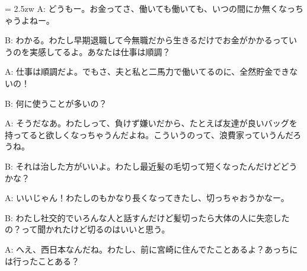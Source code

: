 \documentclass[11pt]{amsart}
\title{}
\author{}
\newenvironment{hangall}[1]{\hangindent = 2.5zw\everypar{\hangindent = 2.5zw}}{}
\begin{document}
\maketitle
\begin{hangall}{}%
A: どうもー。お金ってさ、働いても働いても、いつの間にか無くなっちゃうよねー。



B: わかる。わたし早期退職して今無職だから生きるだけでお金がかかるっていうのを実感してるよ。あなたは仕事は順調？



A: 仕事は順調だよ。でもさ、夫と私と二馬力で働いてるのに、全然貯金できないの！



B: 何に使うことが多いの？



A: そうだなあ。わたしって、負けず嫌いだから、たとえば友達が良いバッグを持ってると欲しくなっちゃうんだよね。こういうのって、浪費家っていうんだろうね。



B: それは治した方がいいよ。わたし最近髪の毛切って短くなったんだけどどうかな？



A: いいじゃん！わたしのもかなり長くなってきたし、切っちゃおうかなー。



B: わたし社交的でいろんな人と話すんだけど髪切ったら大体の人に失恋したの？って聞かれたけど切るのはいいと思う。



A: へえ、西日本なんだね。わたし、前に宮崎に住んでたことあるよ？あっちには行ったことある？\end{hangall}
\end{document}
